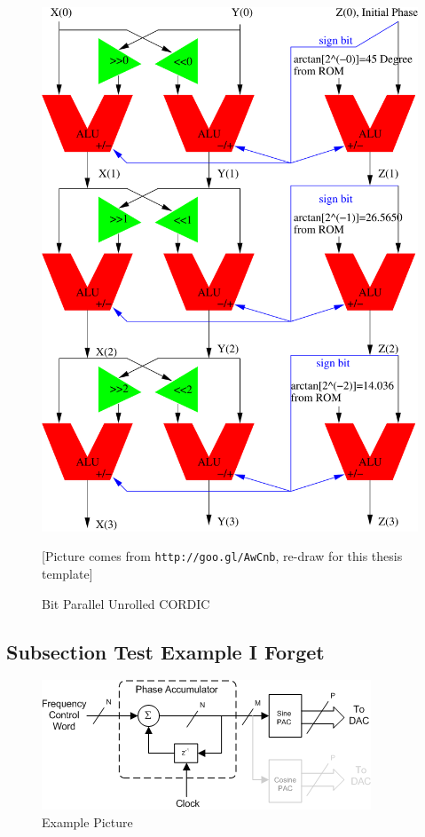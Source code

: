 \begin{figure}[!hbp]
\begin{center}
\includegraphics[width=\textwidth]{graphic/BitParallelUnrollCORDIC.pdf}
\caption{Bit Parallel Unrolled CORDIC}
{\small[Picture comes from \verb|http://goo.gl/AwCnb|, re-draw for this thesis template]}
\label{fig:UnrollCORDIC}
\end{center}
\end{figure}


\subsection{Subsection Test Example I Forget}

\begin{figure}[!hbp]
\begin{center}
\includegraphics[width=\textwidth]{graphic/Generic_NCO.png}
\caption{Example Picture}
\label{fig:NCO}
\end{center}
\end{figure}


